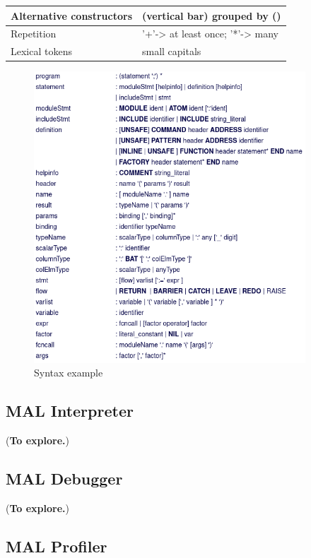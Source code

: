 \documentclass[11pt]{article}
\begin{document}
\begin{center}
\begin{tabular}{ll}
\hline
Alternative constructors & (vertical bar) grouped by ()\\
\hline
Repetition & '+'-> at least once; '*'-> many\\
\hline
Lexical tokens & small capitals\\
\hline
\end{tabular}
\end{center}

\begin{figure}[htbp]
\centering
\includegraphics[width=4.0in]{./Pictures/syntax.png}
\caption{\label{fig:orgbfc69c6}
Syntax example}
\end{figure}

\subsection{MAL Interpreter}
\label{sec:org82709fd}

(\textbf{To explore.})

\subsection{MAL Debugger}
\label{sec:org07787af}

(\textbf{To explore.})

\subsection{MAL Profiler}
\label{sec:org3949670}
\end{document}
